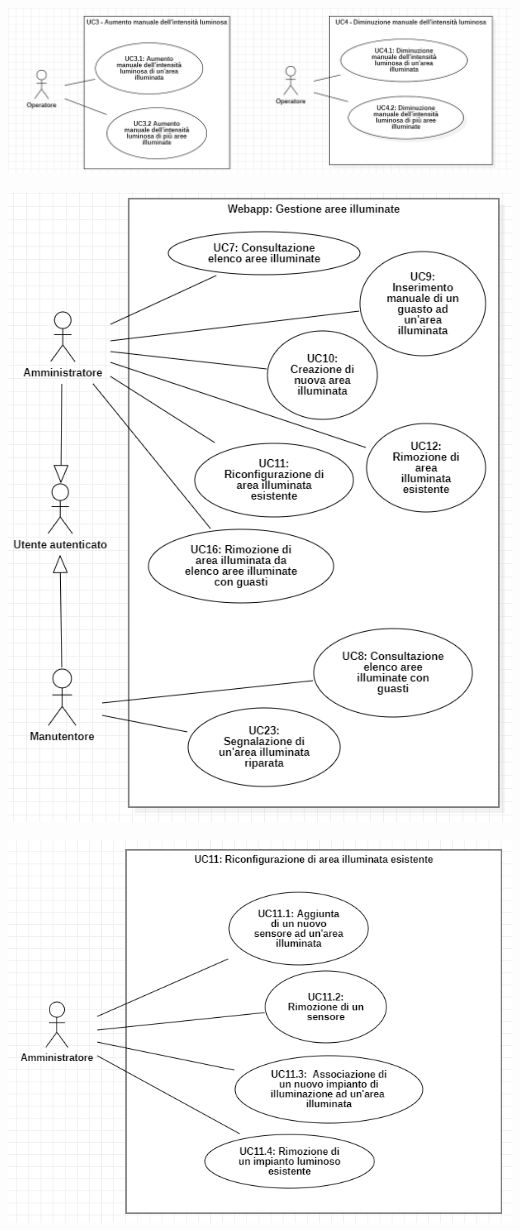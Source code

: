 \documentclass[a4paper, 12pt]{article}
\begin{document}
\includegraphics[scale=0.60]{diagramma_use_case_6e7.png}

\includegraphics[scale=0.7]{diagramma_use_case_8.png}

\includegraphics[scale=0.7]{diagramma_use_case_9.png}
\end{document}
